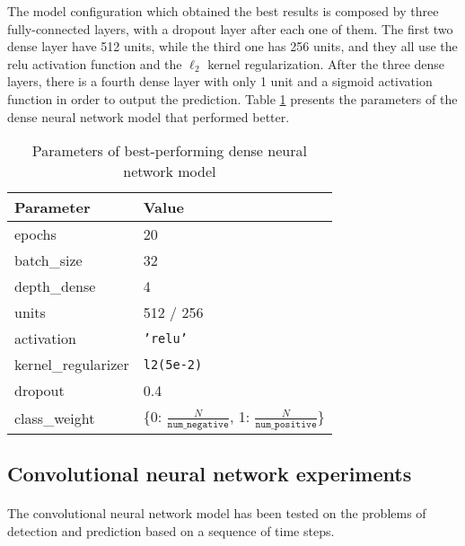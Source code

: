 The model configuration which obtained the best results is composed by three fully-connected layers, with a dropout layer after each one of them. The first two dense layer have 512 units, while the third one has 256 units, and they all use the \acs{relu} activation function and the $\ell_2$ kernel regularization. After the three dense layers, there is a fourth dense layer with only 1 unit and a sigmoid activation function in order to output the prediction. Table \ref{tab:dense_param} presents the parameters of the dense neural network model that performed better.
\begin{table}[htbp]
    \centering
    \begin{tabular}{ll}
        \hline
        \textbf{Parameter}  & \textbf{Value} \\\hline
        epochs              & 20 \\
        batch\_size         & 32 \\
        depth\_dense        & 4 \\
        units               & 512 / 256 \\
        activation          & \texttt{'relu'} \\
        kernel\_regularizer & \texttt{l2(5e-2)} \\
        dropout             & 0.4 \\
        class\_weight       & \{0: $\frac{N}{\texttt{num\_negative}}$, 1: $\frac{N}{\texttt{num\_positive}}$\} \\\hline
    \end{tabular}
    \caption{Parameters of best-performing dense neural network model}
    \label{tab:dense_param}
\end{table}

\subsection{Convolutional neural network experiments}
\paragraph{} The convolutional neural network model has been tested on the problems of detection and prediction based on a sequence of time steps.

